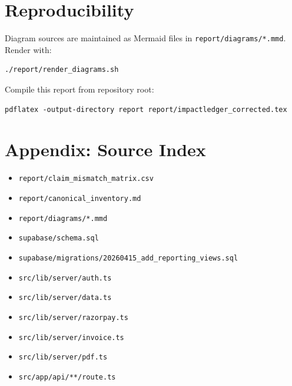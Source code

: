 \documentclass[12pt,a4paper]{article}
\begin{document}
\section{Reproducibility}
Diagram sources are maintained as Mermaid files in \texttt{report/diagrams/*.mmd}. Render with:
\begin{verbatim}
./report/render_diagrams.sh
\end{verbatim}

Compile this report from repository root:
\begin{verbatim}
pdflatex -output-directory report report/impactledger_corrected.tex
\end{verbatim}

\section*{Appendix: Source Index}
\begin{itemize}
  \item \texttt{report/claim\_mismatch\_matrix.csv}
  \item \texttt{report/canonical\_inventory.md}
  \item \texttt{report/diagrams/*.mmd}
  \item \texttt{supabase/schema.sql}
  \item \texttt{supabase/migrations/20260415\_add\_reporting\_views.sql}
  \item \texttt{src/lib/server/auth.ts}
  \item \texttt{src/lib/server/data.ts}
  \item \texttt{src/lib/server/razorpay.ts}
  \item \texttt{src/lib/server/invoice.ts}
  \item \texttt{src/lib/server/pdf.ts}
  \item \texttt{src/app/api/**/route.ts}
\end{itemize}
\end{document}
